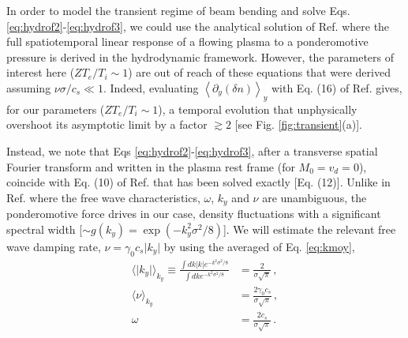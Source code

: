 \documentclass[%
 reprint,
 amsmath,amssymb,
 aps,
]{revtex4-1}
\begin{document}
In order to  model the transient regime of beam bending and solve Eqs. \eqref{eq:hydrof2}-\eqref{eq:hydrof3}, we could use the analytical  solution of Ref. \cite[]{POP_Huller_2020} where the full spatiotemporal linear response of  a flowing plasma to a ponderomotive pressure is derived in the hydrodynamic framework. However, the parameters of interest here ($ZT_e/T_i\sim 1$) are out of reach of these equations that were derived assuming $\nu\sigma/c_s\ll 1$. Indeed, evaluating $\left \langle\partial_y  \left( \delta n  \right)  \right  \rangle_y  $ with Eq. (16) of Ref. \cite[]{POP_Huller_2020}  gives,  for our parameters ($ZT_e/T_i\sim 1$),  a temporal evolution that unphysically overshoot its asymptotic limit by a factor $\gtrsim 2$ [see Fig. \ref{fig:transient}(a)]. 

Instead, we note that Eqs \eqref{eq:hydrof2}-\eqref{eq:hydrof3}, after a transverse spatial Fourier transform and  written in the plasma rest frame (for $M_0=v_d=0$),  coincide with Eq.  (10)  of  Ref. \cite[]{POP_Debayle_2018} that has been solved exactly [Eq. (12)]. 
Unlike in Ref. \cite[]{POP_Debayle_2018} where  the free wave characteristics,  $\omega$, $k_y$ and $\nu$ are unambiguous, the ponderomotive force drives in our case, density fluctuations with a significant spectral width [$\sim  g(k_y)= \exp(-k_y^2\sigma^2 /8)$]. 
We will estimate the relevant free wave damping rate, $\nu=\gamma_0 c_s \vert k_y \vert$ by using the averaged of Eq. \eqref{eq:kmoy},
\begin{align}
 \langle \vert k_y\vert  \rangle_{k_y}\equiv \frac{\int dk\vert k\vert  e^{-k^2\sigma^2 /8} }{\int dk e^{-k^2\sigma^2 /8}} & = \frac{2}{\sigma \sqrt{\pi}}\, , \\
 \langle \nu \rangle_{k_y} & = \frac{2\gamma_0 c_s}{\sigma \sqrt{\pi}}\, , \\
\omega  & = \frac{2c_s}{\sigma \sqrt{\pi}}\, .
\end{align}
\end{document}
